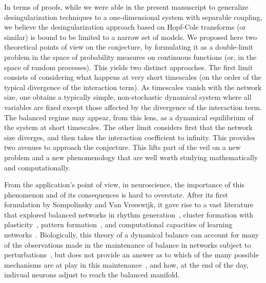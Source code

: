 \documentclass[onefignum,onetabnum]{siamart190516}
\newcommand{\1}{\mathbbm{1}}
\newcommand{\review}[1]{\textcolor{midblue}{ #1}}
\renewcommand{\review}[1]{{ #1}}
\begin{document}
\review{In terms of proofs, while we were able in the present manuscript to generalize desingularization techniques to a one-dimensional system with separable coupling, we believe the desingularization approach based on Hopf-Cole transforms (or similar) is bound to be limited to a narrow set of models. We proposed here two theoretical points of view on the conjecture, by formulating it as a double-limit problem in the space of probability measures on continuous functions (or, in the space of random processes). This yields two distinct approaches. The first limit consists of considering what happens at very short timescales (on the order of the typical divergence of the interaction term). As timescales vanish with the network size, one obtains a typically simple, non-stochastic dynamical system where all variables are fixed except those affected by the divergence of the interaction term. The balanced regime may appear, from this lens, as a dynamical equilibrium of the system at short timescales. The other limit considers first that the network size diverges, and then takes the interaction coefficient to infinity. This provides two avenues to approach the conjecture. This lifts part of the veil on a new problem and a new phenomenology that are well worth studying mathematically and computationally. }

\review{From the application's point of view, in neuroscience, the importance of this phenomenon and of its consequences is hard to overstate. After its first formulation by Sompolinsky and Van Vreeswijk, it gave rise to a vast literature that explored balanced networks in rhythm generation~\cite{brunel2000dynamics,brunel2000dynamics2}, cluster formation with plasticity~\cite{litwin2014formation,litwin2012slow}, pattern formation~\cite{rosenbaum2014balanced}, and computational capacities of learning networks~\cite{leone2025noise,kadmon2020predictive,stock2022synaptic}. Biologically, this theory of a dynamical balance can account for many of the observations made in the maintenance of balance in networks subject to perturbations~\cite{dai2016maintenance,chen2022homeostatic}, but does not provide an answer as to which of the many possible mechanisms are at play in this maintenance~\cite{turrigiano47keeping,turrigiano2003homeostatic,turrigiano2011too,turrigiano2008self}, and how, at the end of the day, indivual neurons adjust to reach the balanced manifold.}
\end{document}
